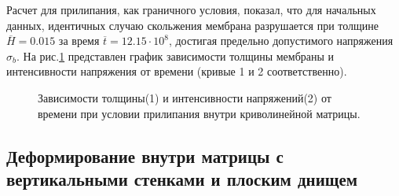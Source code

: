 Расчет для прилипания, как граничного условия,	показал, что для начальных данных, идентичных случаю скольжения 
	мембрана разрушается при толщине $\overline{H}=0.015$ за время $\overline{t}=12.15\cdot 10^8$, достигая предельно допустимого напряжения $\sigma_b$.    На рис.\ref{quad_sticking} представлен график зависимости толщины мембраны и интенсивности напряжения от времени (кривые 1 и 2 соответственно).
   
		\begin{figure}[h!]	
				\def\svgwidth{\columnwidth}
				\caption{Зависимости толщины(1) и интенсивности напряжений(2) от времени при условии прилипания внутри криволинейной матрицы. } 
				\label{quad_sticking}
		\end{figure}

\subsection{Деформирование внутри матрицы с вертикальными стенками и плоским днищем}
		
